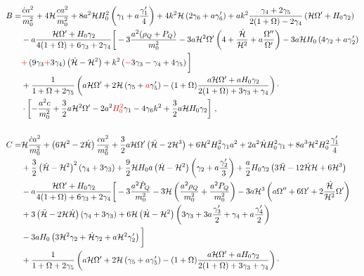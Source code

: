 \documentclass[prd,nofootinbib,showpacs]{revtex4}
\def\l{\left}
\def\r{\right}
\def\f{\frac}
\def\hub{{\mathcal H}}
\begin{document}
{\begin{align}
%
B =& \f{\dot{c}a^2}{m_0^2} +4\hub \f{c a^2}{m_0^2} +8 a^2\hub H_0^2\l(\gamma_1 +a\f{\gamma_1^\prime}{4}\r) +4k^2\hub\l(2\gamma_6 +a\gamma_6^\prime \r) + ak^2 \f{\gamma_4+2\gamma_5}{2(1+\Omega) -2\gamma_4}\l(\hub\Omega' +H_0\gamma_2\r) \nonumber\\
& -a\f{\hub \Omega' + H_0\gamma_2}{4(1+\Omega)+6\gamma_3 +2\gamma_4}\bigg[ -3\f{a^2(\rho_{Q}+P_Q)}{m_0^2} -3a\hub^2\Omega'\l( 4+ \f{\dot{\hub}}{\hub^2} +a\f{\Omega''}{\Omega'}\r) -3a\hub H_0 \l(4\gamma_2+a\gamma_2^\prime\r) \nonumber\\
& \textcolor{red}{+}\l(9 \gamma_3\textcolor{red}{+}3\gamma_4 \r)\l(\dot{\hub} -\hub^2\r) +k^2\l(\textcolor{red}{-}3\gamma_3-\gamma_4 +4\gamma_5 \r)\bigg]  \nonumber \\
& +\f{1}{1+\Omega+2\gamma_5}\l( a\hub\Omega' +2\hub\l(\gamma_5+\textcolor{red}{a}\gamma_5^\prime\r) -(1+\Omega)\f{a\hub\Omega' +aH_0\gamma_2}{2(1+\Omega) +3\gamma_3+\gamma_4}\r)\cdot \nonumber\\
&\cdot\l[-\f{a^2c}{m_0^2}+\f{3}{2}a\hub^2\Omega'-2a^2\textcolor{red}{H_0^2}\gamma_1-4\gamma_6k^2 +\f{3}{2}a\hub H_0\gamma_2 \r] \, , \\
%
& \nonumber \\
%
C =&  \hub\f{\dot{c}a^2}{m_0^2} +\l(6\hub^2-2\dot{\hub}\r)\f{ca^2}{m_0^2}  +\f{3}{2}a\hub\Omega'\l(\ddot{\hub} -2\hub^3\r) +6\hub^2H_0 ^2\gamma_1a^2 + 2a^2\dot{\hub} H_0^2\gamma_1 +8a^3\hub^2 H_0^2\f{\gamma_1^\prime}{4} \nonumber\\
& +\f{3}{2}\l(\dot{\hub} -\hub^2\r)^2\l(\gamma_4 +3\gamma_3\r) +\f{9}{2}\hub H_0 a\l(\dot{\hub}-\hub^2\r)\l(\gamma_2+a\f{\gamma_2^\prime}{3}\r) +\f{a}{2}H_0\gamma_2\l(3\ddot{\hub}-12\dot{\hub}\hub +6\hub^3\r) \nonumber \\
& -a\f{\hub \Omega' + H_0\gamma_2}{4(1+\Omega)+6\gamma_3+2\gamma_4}\bigg[ -3\f{a^2\dot{P}_Q}{m_0^2}-3\hub \l(\f{a^2\rho_Q}{m_0^2} +\f{a^2 P_Q}{m_0^2}\r) -3a\hub^3\l(a\Omega'' +6\Omega' +2\f{\dot{\hub}}{\hub^2}\Omega' \r) \nonumber\\
& +3\l(\ddot{\hub}-2\hub \dot{\hub}\r)\l(\gamma_4 +3\gamma_3\r) +6\hub\l(\dot{\hub}-\hub^2\r)\l(3\gamma_3+3a\f{\gamma_3^\prime}{2} +\gamma_4+a\f{\gamma_4^\prime}{2}\r) \nonumber \\
& -3a H_0\l(3\hub^2\gamma_2+\dot{\hub}\gamma_2 +a\hub^2\gamma_2^\prime\r) \bigg] \nonumber \\
& +\f{1}{1+\Omega+2\gamma_5}\l( a\hub\Omega' +2\hub\l(\gamma_5+a\gamma_5^\prime\r) -(1+\Omega)\f{a\hub\Omega' +aH_0\gamma_2}{2(1+\Omega) +3\gamma_3+\gamma_4}\r)\cdot \nonumber\\

\end{align}}
\end{document}
